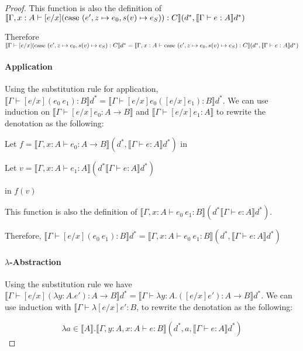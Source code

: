 \begin{proof}
This function is also the definition of $\llbracket \Gamma , x : A \vdash [e/x](\case \ (e',z \mapsto e_0, s(v) \mapsto e_S)): C \rrbracket (d^*, \llbracket \Gamma \vdash e : A \rrbracket d^*)$

Therefore $\llbracket \Gamma \vdash [e/x] (\operatorname{case} \ (e', z \mapsto e_0, s(v) \mapsto e_S): C \rrbracket d^* = \llbracket \Gamma , x : A \vdash \operatorname{case} \ (e', z \mapsto e_0, s(v) \mapsto e_S): C \rrbracket (d^*, \llbracket \Gamma \vdash e : A \rrbracket d^*)$

\paragraph{Application} Using the substitution rule for application, $\llbracket \Gamma \vdash [e/x](e_0 \ e_1) : B \rrbracket d^* = \llbracket \Gamma \vdash [e/x]e_0 ([e/x] e_1) : B \rrbracket d^*$. We can use induction on $\llbracket \Gamma \vdash [e/x]e_0 : A \to B \rrbracket$ and $ \llbracket \Gamma \vdash [e/x]e_1 : A \rrbracket$ to rewrite the denotation as the following:

Let $f = \llbracket \Gamma, x : A \vdash e_0 : A \to B \rrbracket (d^*,\llbracket \Gamma \vdash e : A \rrbracket d^*) $ in 

\hspace{4.5cm} Let $v = \llbracket \Gamma, x : A \vdash e_1 : A \rrbracket (d^* \llbracket \Gamma \vdash e : A \rrbracket d^*)$ 

\hspace{7cm} in $f(v)$

This function is also the definition of $\llbracket \Gamma, x : A \vdash e_0 \ e_1 : B \rrbracket (d^* \llbracket \Gamma \vdash e : A \rrbracket d^*)$.

Therefore, $\llbracket \Gamma \vdash [e/x](e_0 \ e_1) : B \rrbracket d^* = \llbracket \Gamma, x : A \vdash e_0 \ e_1 : B \rrbracket (d^*, \llbracket \Gamma \vdash e : A \rrbracket d^*)$


\paragraph{$\lambda$-Abstraction} Using the substitution rule we have $\llbracket \Gamma \vdash [e/x](\lambda y : A.e') : A \to B \rrbracket d^* = \llbracket \Gamma \vdash \lambda y : A. ([e/x] e') : A \to B \rrbracket d^*$. We can use induction with $\llbracket \Gamma \vdash \lambda [e/x] e' : B$, to rewrite the denotation as the following:

 \[\lambda a \in \llbracket A \rrbracket . \llbracket \Gamma, y : A, x : A  \vdash e : B \rrbracket(d^*, a , \llbracket \Gamma \vdash e : A \rrbracket d^*)\]


\end{proof}

